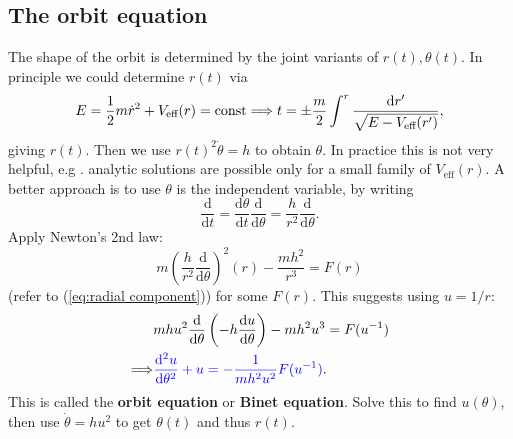 \subsection{The orbit equation}
The shape of the orbit is determined by the joint variants of $ r(t),\theta(t) $. In principle we could determine $r(t)$ via 
\[
    E=\frac{1}{2}m \dot{r}^2+V_{\text{eff}}(r)=\text{const} \Longrightarrow t = \pm \frac{m}{2}\int^{r} \frac{\mathrm{d} r'}{\sqrt{E-V_{\text{eff}}(r')}},
\]
giving $r(t)$. Then we use $ r(t)^2 \dot{\theta}=h $ to obtain $\theta$. In practice this is not very helpful, e.g . analytic solutions are possible only for a small family of $ V_{\text{eff}}(r) $. A better approach is to use $ \theta $ is the independent variable, by writing
\[
    \frac{\mathrm{d}}{\mathrm{d}t} = \frac{\mathrm{d}\theta}{\mathrm{d}t}\frac{\mathrm{d}}{\mathrm{d}\theta} = \frac{h}{r^2}\frac{\mathrm{d}}{\mathrm{d}\theta}.    
\]
Apply Newton's 2nd law: 
\[
    m \left( \frac{h}{r^2}\frac{\mathrm{d}}{\mathrm{d}\theta} \right)^2(r)-\frac{mh^2}{r^3}=F(r)
\]
(refer to (\ref{eq:radial component})) for some $F(r)$. This suggests using $u=1/r$: 
\begin{align*}
    &mhu^2 \frac{\mathrm{d}}{\mathrm{d}\theta}\left( -h \frac{\mathrm{d}u}{\mathrm{d}\theta}  \right) -mh^2u^3=F(u^{-1})\\ 
    \Longrightarrow & {\color{blue}\frac{\mathrm{d}^2 u}{\mathrm{d}\theta^2}+u = -\frac{1}{mh^2u^2} F(u^{-1})}.
\end{align*}
This is called the \textbf{orbit equation} or \textbf{Binet equation}. Solve this to find $ u(\theta) $, then use $ \dot{\theta} = hu^2 $ to get $ \theta(t) $ and thus $ r(t) $.